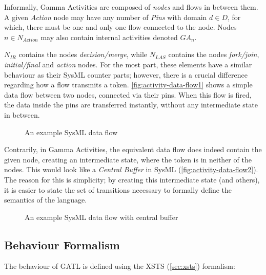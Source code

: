 \begin{definition}
Informally, Gamma Activities are composed of \emph{nodes} and flows in between them. A given  \emph{Action} node may have any number of \emph{Pins} with domain \(d \in D\), for which, there must be one and only one flow connected to the node. Nodes \(n \in N_\mathit{Action}\) may also contain internal activities denoted \(\mathit{GA}_\mathit{n}\).

\(N_\mathit{IR}\) contains the nodes \emph{decision/merge}, while \(N_\mathit{LAS}\) contains the nodes \emph{fork/join}, \emph{initial/final} and \emph{action} nodes. For the most part, these elements have a similar behaviour as their SysML counter parts; however, there is a crucial difference regarding how a flow transmits a token. \autoref{fig:activity-data-flow1} shows a simple data flow between two nodes, connected via their pins. When this flow is fired, the data inside the pins are transferred instantly, without any intermediate state in between. 

\begin{figure}[!ht]
	\centering
	
	\caption{An example SysML data flow}
	\label{fig:activity-data-flow1}
\end{figure}

Contrarily, in Gamma Activities, the equivalent data flow does indeed contain the given node, creating an intermediate state, where the token is in neither of the nodes. This would look like a \emph{Central Buffer} in SysML (\autoref{fig:activity-data-flow2}). The reason for this is simplicity; by creating this intermediate state (and others), it is easier to state the set of transitions necessary to formally define the semantics of the language.

\begin{figure}[!ht]
	\centering
	
	\caption{An example SysML data flow with central buffer}
	\label{fig:activity-data-flow2}
\end{figure}
	
\end{definition}\label{def:activity-structure}

\subsection{Behaviour Formalism}

The behaviour of GATL is defined using the XSTS (\autoref{sec:xsts}) formalism:

